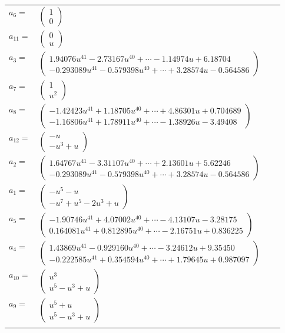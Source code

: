 \documentclass[1p]{elsarticle_modified}
\theoremstyle{definition}
\begin{document}
\begin{tabular}{m{7pt} m{180pt} m{7pt} m{180pt} }
\flushright $a_{6}=$&$\begin{pmatrix}1\\0\end{pmatrix}$ \\
\flushright $a_{11}=$&$\begin{pmatrix}0\\u\end{pmatrix}$ \\
\flushright $a_{3}=$&$\begin{pmatrix}1.94076 u^{41}-2.73167 u^{40}+\cdots-1.14974 u+6.18704\\-0.293089 u^{41}-0.579398 u^{40}+\cdots+3.28574 u-0.564586\end{pmatrix}$ \\
\flushright $a_{7}=$&$\begin{pmatrix}1\\u^2\end{pmatrix}$ \\
\flushright $a_{8}=$&$\begin{pmatrix}-1.42423 u^{41}+1.18705 u^{40}+\cdots+4.86301 u+0.704689\\-1.16806 u^{41}+1.78911 u^{40}+\cdots-1.38926 u-3.49408\end{pmatrix}$ \\
\flushright $a_{12}=$&$\begin{pmatrix}- u\\- u^3+u\end{pmatrix}$ \\
\flushright $a_{2}=$&$\begin{pmatrix}1.64767 u^{41}-3.31107 u^{40}+\cdots+2.13601 u+5.62246\\-0.293089 u^{41}-0.579398 u^{40}+\cdots+3.28574 u-0.564586\end{pmatrix}$ \\
\flushright $a_{1}=$&$\begin{pmatrix}- u^5- u\\- u^7+u^5-2 u^3+u\end{pmatrix}$ \\
\flushright $a_{5}=$&$\begin{pmatrix}-1.90746 u^{41}+4.07002 u^{40}+\cdots-4.13107 u-3.28175\\0.164081 u^{41}+0.812895 u^{40}+\cdots-2.16751 u+0.836225\end{pmatrix}$ \\
\flushright $a_{4}=$&$\begin{pmatrix}1.43869 u^{41}-0.929160 u^{40}+\cdots-3.24612 u+9.35450\\-0.222585 u^{41}+0.354594 u^{40}+\cdots+1.79645 u+0.987097\end{pmatrix}$ \\
\flushright $a_{10}=$&$\begin{pmatrix}u^3\\u^5- u^3+u\end{pmatrix}$ \\
\flushright $a_{9}=$&$\begin{pmatrix}u^5+u\\u^5- u^3+u\end{pmatrix}$\\&\end{tabular}
\end{document}
